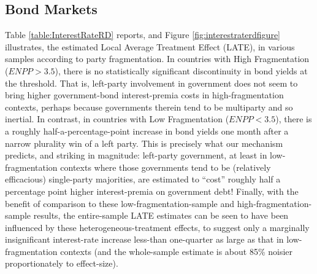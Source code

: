 \documentclass[12pt]{article}
\begin{document}
\subsection{Bond Markets}

Table \ref{table:InterestRateRD} reports, and Figure  \ref{fig:interestraterdfigure} illustrates, the estimated Local Average Treatment Effect (LATE), in various samples according to party fragmentation. In countries with High Fragmentation ($ENPP > 3.5$), there is no statistically significant discontinuity in bond yields at the threshold. That is, left-party involvement in government does not seem to bring higher government-bond interest-premia costs in high-fragmentation contexts, perhaps because governments therein tend to be multiparty and so inertial. In contrast, in countries with Low Fragmentation ($ENPP < 3.5$), there is a roughly half-a-percentage-point increase in bond yields one month after a narrow plurality win of a left party. This is precisely what our mechanism predicts, and striking in magnitude: left-party government, at least in low-fragmentation contexts where those governments tend to be (relatively efficacious) single-party majorities, are estimated to ``cost'' roughly half a percentage point higher interest-premia on government debt! Finally, with the benefit of comparison to these low-fragmentation-sample and high-fragmentation-sample results, the entire-sample LATE estimates can be seen to have been influenced by these heterogeneous-treatment effects, to suggest only a marginally insignificant interest-rate increase less-than one-quarter as large as that in low-fragmentation contexts (and the whole-sample estimate is about 85\% noisier proportionately to effect-size).

\end{document}
